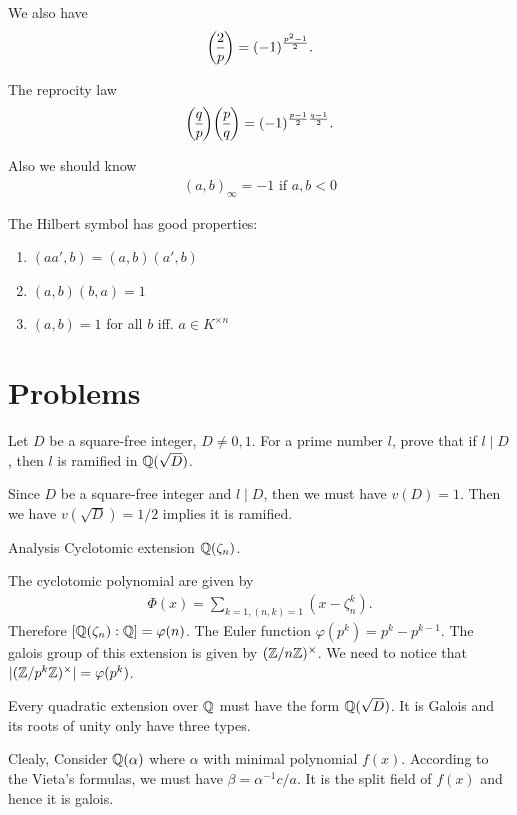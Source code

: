 {We also have
\begin{align*}
    \legendre{2}{p} = (-1)^{\frac{p^2-1}{2}}.
\end{align*} 

The reprocity law 
\begin{align*}
    \legendre{q}{p}\legendre{p}{q} = (-1)^{\frac{p-1}{2}\frac{q-1}{2}}.
\end{align*}

Also we should know 
\begin{align*}
    (a,b)_{\infty} = -1 \text{ if }a,b<0
\end{align*}


The Hilbert symbol has good properties: 
\begin{enumerate}
    \item[bilinear] $(aa',b) = (a,b)(a',b)$
    \item[skew-sysmetric] $(a,b)(b,a)=1$
    \item[non-degenerated] $(a,b)=1$ for all $b$ iff. $a\in K^{\times n}$  
\end{enumerate}


\section*{Problems}
\prob  Let $D$ be a square-free integer, $D\neq 0,1$. For a prime number $l$, prove that if $l\mid D$, then $l$ is ramified in $\mathbb{Q}(\sqrt{D})$.

Since $D$ be a square-free integer and $l\mid D$, then we must have $v(D)=1$. Then we have $v(\sqrt{D})=1/2$ implies it is ramified.

\prob Analysis Cyclotomic extension $\mathbb{Q}(\zeta_n)$.

The cyclotomic polynomial are given by 
\begin{align*}
    \Phi(x) = \sum_{k=1,(n,k)=1}(x-\zeta_n^k).
\end{align*}
Therefore $[\mathbb{Q}(\zeta_n):\mathbb{Q}]=\varphi(n)$. The Euler function $\varphi(p^k)=p^k-p^{k-1}$. 
The galois group of this extension is given by  $(\mathbb{Z}/n\mathbb{Z})^\times$. We need to notice that $|(\mathbb{Z}/p^k\mathbb{Z})^\times|=\varphi(p^k)$.

\prob Every quadratic extension over $\mathbb{Q}$ must have the form $\mathbb{Q}(\sqrt{D})$. It is Galois and its roots of unity only have three types.

Clealy, Consider $\mathbb{Q}(\alpha)$ where $\alpha$ with minimal polynomial $f(x)$. 
According to the Vieta's formulas, we must have $\beta = \alpha^{-1}c/a$. It is the split field of $f(x)$ and hence it is galois.

}
